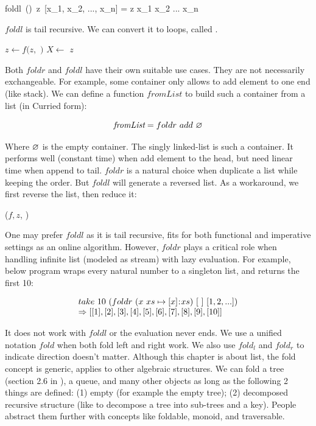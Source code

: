 \documentclass[b5paper]{article}
\begin{document}
\be
foldl\ (\oplus)\ z\ [x_1, x_2, ..., x_n] = z \oplus x_1 \oplus x_2 \oplus ... \oplus x_n
\ee

$foldl$ is tail recursive. We can convert it to loops, called .

\begin{algorithmic}[1]
    \State $z \gets f(z, $  $)$
    \State $X \gets$ 
  \EndWhile
  \State \Return $z$
\EndFunction
\end{algorithmic}

Both $foldr$ and $foldl$ have their own suitable use cases. They are not necessarily exchangeable. For example, some container only allows to add element to one end (like stack). We can define a function $\textit{fromList}$ to build such a container from a list (in Curried form):

\[
\textit{fromList} = foldr\ add\ \nil
\]

Where $\varnothing$ is the empty container. The singly linked-list is such a container. It performs well (constant time) when add element to the head, but need linear time when append to tail. $foldr$ is a natural choice when duplicate a list while keeping the order. But $foldl$ will generate a reversed list. As a workaround, we first reverse the list, then reduce it:

\begin{algorithmic}[1]
  \State \Return {}($f, z$, )
\EndFunction
\end{algorithmic}

One may prefer $foldl$ as it is tail recursive, fits for both functional and imperative settings as an online algorithm. However, $foldr$ plays a critical role when handling infinite list (modeled as stream) with lazy evaluation. For example, below program wraps every natural number to a singleton list, and returns the first 10:

\[
\begin{array}{l}
take\ 10\ (foldr\ (x\ xs \mapsto [x] \mathbin{\!:\!} xs)\ [\ ]\ [1, 2, ...]) \\
\Rightarrow [[1], [2], [3], [4], [5], [6], [7], [8], [9], [10]]
\end{array}
\]

It does not work with $foldl$ or the evaluation never ends. We use a unified notation $fold$ when both fold left and right work. We also use $fold_l$ and $fold_r$ to indicate direction doesn't matter. Although this chapter is about list, the fold concept is generic, applies to other algebraic structures. We can fold a tree (section 2.6 in \cite{unplugged}), a queue, and many other objects as long as the following 2 things are defined: (1) empty (for example the empty tree); (2) decomposed recursive structure (like to decompose a tree into sub-trees and a key). People abstract them further with concepts like foldable, monoid, and traversable.
\end{document}
